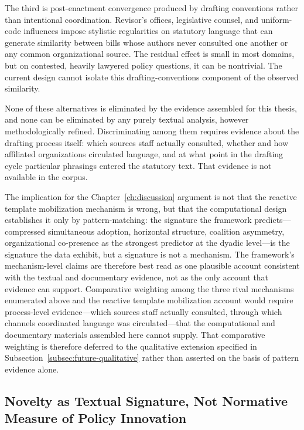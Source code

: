 The third is post-enactment convergence produced by drafting conventions rather than intentional coordination. Revisor's offices, legislative counsel, and uniform-code influences impose stylistic regularities on statutory language that can generate similarity between bills whose authors never consulted one another or any common organizational source. The residual effect is small in most domains, but on contested, heavily lawyered policy questions, it can be nontrivial. The current design cannot isolate this drafting-conventions component of the observed similarity.

None of these alternatives is eliminated by the evidence assembled for this thesis, and none can be eliminated by any purely textual analysis, however methodologically refined. Discriminating among them requires evidence about the drafting process itself: which sources staff actually consulted, whether and how affiliated organizations circulated language, and at what point in
the drafting cycle particular phrasings entered the statutory text. That
evidence is not available in the corpus.

The implication for the Chapter~\ref{ch:discussion} argument is not that the reactive template mobilization mechanism is wrong, but that the computational design establishes it only by pattern-matching: the signature the framework predicts---compressed simultaneous adoption, horizontal structure, coalition asymmetry, organizational co-presence as the strongest predictor at the dyadic level---is the signature the data exhibit, but a signature is not a mechanism. The framework's mechanism-level claims are therefore best read as one plausible account consistent with the textual and documentary evidence, not as the only account that evidence can support. Comparative weighting among the three rival mechanisms enumerated above and the reactive template mobilization account would require process-level evidence---which sources staff actually consulted, through which channels coordinated language was circulated---that the computational and documentary materials assembled here cannot supply. That comparative weighting is therefore deferred to the qualitative extension specified in Subsection~\ref{subsec:future-qualitative} rather than asserted on the basis of pattern evidence alone.

\subsection{Novelty as Textual Signature, Not Normative Measure of Policy Innovation}
\label{subsec:novelty-signature}

